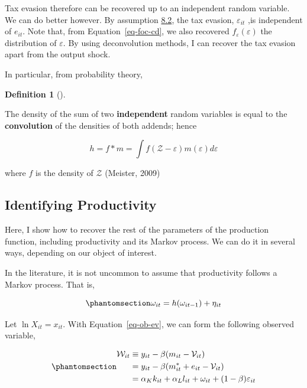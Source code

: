 \documentclass[
  12pt]{article}
\theoremstyle{definition}
\newtheorem{definition}{Definition}[section]
\theoremstyle{remark}
\newenvironment{fbx}[3]{\begin{tcolorbox}[enhanced, breakable,%
attach boxed title to top*={xshift=1.4pt},
boxed title style={boxrule=0.0mm, fuzzy shadow={1pt}{-1pt}{0mm}{0.1mm}{gray}, arc=.3em, rounded corners=east, sharp corners=west}, colframe=#1-color2, colbacktitle=#1-color1, colback = white, coltitle=black,  titlerule=0mm, toprule=0pt, bottomrule=.7pt, leftrule=.3em, rightrule=0pt, outer arc=.3em,  arc=0pt,	 sharp corners = east, left=.5em, bottomtitle=1mm, toptitle=1mm,title=\textbf{#2}\hspace{0.5em}{#3}]}
{\end{tcolorbox}}
\begin{document}
Tax evasion therefore can be recovered up to an independent random
variable. We can do better however. By assumption
\hyperref[ass-ind]{8.2}, the tax evasion, \(\varepsilon_{it}\) ,is
independent of \(e_{it}\). Note that, from Equation~\ref{eq-foc-cd}, we
also recovered \(f_{\varepsilon}(\varepsilon)\) the distribution of
\(\varepsilon\). By using deconvolution methods, I can recover the tax
evasion apart from the output shock.

In particular, from probability theory,

\begin{definition}[]\protect\hypertarget{def-conv}{}\label{def-conv}

\begin{fbx}{Definition}{Definition: }{Convolution}
\label{}
The density of the sum of two \textbf{independent} random variables is
equal to the \textbf{convolution} of the densities of both addends;
hence

\[
h = f*m = \int f(\mathcal Z - \varepsilon)m(\varepsilon)d\varepsilon
\]

where \(f\) is the density of \(\mathcal Z\) (Meister, 2009)

\end{fbx}

\end{definition}

\subsection{Identifying Productivity}\label{identifying-productivity}

Here, I show how to recover the rest of the parameters of the production
function, including productivity and its Markov process. We can do it in
several ways, depending on our object of interest.

In the literature, it is not uncommon to assume that productivity
follows a Markov process. That is,

\begin{equation}\phantomsection\label{eq-prod-markov}{
    \omega_{it}=h(\omega_{it-1})+\eta_{it}
}\end{equation}

Let \(\ln X_{it}=x_{it}\). With Equation~\ref{eq-ob-ev}, we can form the
following observed variable,

\begin{equation}\phantomsection\label{eq-big-w}{
\begin{aligned}
    \mathcal W_{it} & \equiv y_{it} - \beta (m_{it}-\mathcal{V}_{it})\\
    & = y_{it} - \beta (m^*_{it}+e_{it}-\mathcal{V}_{it})\\
    & = \alpha_K k_{it}+\alpha_L l_{it}+\omega_{it}+(1-\beta)\varepsilon_{it}
\end{aligned}
}\end{equation}
\end{document}
